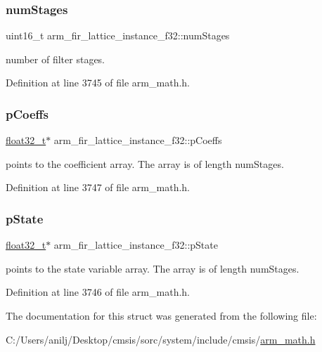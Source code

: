 \subsubsection{\texorpdfstring{num\+Stages}{numStages}}
{\footnotesize\ttfamily uint16\+\_\+t arm\+\_\+fir\+\_\+lattice\+\_\+instance\+\_\+f32\+::num\+Stages}

number of filter stages. 

Definition at line 3745 of file arm\+\_\+math.\+h.

\mbox{\label{structarm__fir__lattice__instance__f32_a33bf5948c947f9ef80a99717cb0a0a43}} 
\subsubsection{\texorpdfstring{p\+Coeffs}{pCoeffs}}
{\footnotesize\ttfamily \hyperlink{arm__math_8h_a4611b605e45ab401f02cab15c5e38715}{float32\+\_\+t}$\ast$ arm\+\_\+fir\+\_\+lattice\+\_\+instance\+\_\+f32\+::p\+Coeffs}

points to the coefficient array. The array is of length num\+Stages. 

Definition at line 3747 of file arm\+\_\+math.\+h.

\mbox{\label{structarm__fir__lattice__instance__f32_ae348884a1ba9b83fadccd5da640cbcaf}} 
\subsubsection{\texorpdfstring{p\+State}{pState}}
{\footnotesize\ttfamily \hyperlink{arm__math_8h_a4611b605e45ab401f02cab15c5e38715}{float32\+\_\+t}$\ast$ arm\+\_\+fir\+\_\+lattice\+\_\+instance\+\_\+f32\+::p\+State}

points to the state variable array. The array is of length num\+Stages. 

Definition at line 3746 of file arm\+\_\+math.\+h.



The documentation for this struct was generated from the following file\+:\begin{DoxyCompactItemize}
\item 
C\+:/\+Users/anilj/\+Desktop/cmsis/sorc/system/include/cmsis/\hyperlink{arm__math_8h}{arm\+\_\+math.\+h}\end{DoxyCompactItemize}
